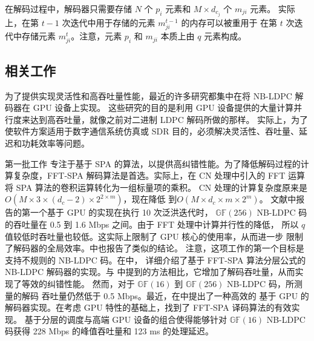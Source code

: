 \documentclass{cjc}
\begin{document}
  在解码过程中，解码器只需要存储 $N$ 个 $p_i$ 元素和 $M\times{d_{c_j}}$ 个 $m_{ji}$ 元素。
  实际上，在第 $t−1$ 次迭代中用于存储的元素 $m^{t-1}_{ji}$ 的内存可以被重用于
  在第 $t$ 次迭代中存储元素 $m^t_{ji}$。注意，元素 $p_i$ 和 $m_{ji}$ 本质上由 $q$ 元素构成。

\subsection{相关工作}
  
  为了提供实现灵活性和高吞吐量性能，最近的许多研究都集中在将 NB-LDPC 解码器在 GPU 设备上实现\cite{noauthor_wang_nodate,noauthor_andrade_nodate,noauthor_beermann_nodate,andrade_optimized_2014,noauthor_thi_nodate,beermann_gpu_2015,noauthor_pham_nodate,liu_high-throughput_2018}。
  这些研究的目的是利用 GPU 设备提供的大量计算并行度来达到高吞吐量，就像之前对二进制
  LDPC 解码所做的那样\cite{li_efficient_2013,lin_high_2014,gal_high-throughput_2016}。
  实际上，为了使软件方案适用于数字通信系统仿真或 SDR 目的，必须解决灵活性、吞吐量、延迟和功耗效率等问题。

  第一批工作\cite{noauthor_andrade_nodate,noauthor_beermann_nodate,andrade_optimized_2014,beermann_gpu_2015,liu_high-throughput_2018}
  专注于基于 SPA 的算法，以提供高纠错性能。为了降低解码过程的计算复杂度，FFT-SPA \cite{noauthor_andrade_nodate}
  解码算法是首选。实际上，在 CN 处理中引入的 FFT 运算将 SPA 算法的卷积运算转化为一组标量项的乘积。
  CN 处理的计算复杂度原来是$O(M\times3\times(d_c−2)\times2^{2{\times}m})$，现在降低
  到$O(M\times{d_c}\times{m}\times2^{m})$\cite{declercq_decoding_2007}。
  文献\cite{noauthor_andrade_nodate}中报告的第一个基于 GPU 的实现在执行 10 次泛洪迭代时，
  $\mathbb{GF}(256)$ NB-LDPC 码的吞吐量在 0.5 到 1.6 Mbps 之间。由于 FFT 处理中计算并行性的降低，
  所以 $q$ 值较低时吞吐量也较低。这实际上限制了 GPU 核心的使用率，从而进一步
  限制了解码器的全局效率。\cite{noauthor_beermann_nodate}中也报告了类似的结论。
  注意，这项工作的第一个目标是支持不规则的 NB-LDPC 码。在\cite{beermann_gpu_2015}中，
  详细介绍了基于 FFT-SPA 算法分层公式的 NB-LDPC 解码器的实现。与\cite{noauthor_beermann_nodate}
  中提到的方法相比，它增加了解码吞吐量，从而实现了等效的纠错性能。
  然而，对于 $\mathbb{GF}(16)$ 到 $\mathbb{GF}(256)$ NB-LDPC 码，所测量的解码
  吞吐量仍然低于 0.5 Mbps。最近，在\cite{liu_high-throughput_2018}中提出了一种高效的
  基于 GPU 的解码器实现。在考虑 GPU 特性的基础上，找到了 FFT-SPA 译码算法的有效实现。
  基于分层的调度与高端 GPU 设备的组合使得能够针对 $\mathbb{GF}(16)$ NB-LDPC 码获得
  228 Mbps 的峰值吞吐量和 123 ms 的处理延迟。
\end{document}
